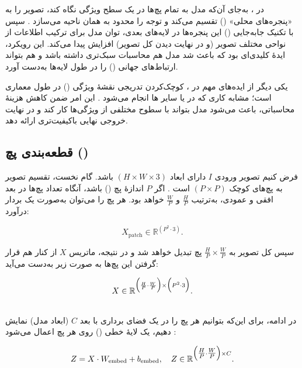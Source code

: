 در ، به‌جای آن‌که مدل به تمام پچ‌ها در یک سطح ویژگی نگاه کند، تصویر را به «پنجره‌های محلی» () تقسیم می‌کند و توجه را محدود به همان ناحیه می‌سازد \cite{liu2021swintransformer}. سپس با تکنیک جابه‌جایی () این پنجره‌ها در لایه‌های بعدی، توان مدل برای ترکیب اطلاعات از نواحی مختلف تصویر (و در نهایت دیدن کل تصویر) افزایش پیدا می‌کند. این رویکرد، ایدهٔ کلیدی‌ای بود که باعث شد مدل هم محاسبات سبک‌تری داشته باشد و هم بتواند ارتباط‌های جهانی () را در طول لایه‌ها به‌دست آورد.

یکی دیگر از ایده‌های مهم در ، کوچک‌کردن تدریجی نقشهٔ ویژگی () در طول معماری است؛ مشابه کاری که در  یا سایر ها انجام می‌شود \cite{he2016deep}. این امر ضمن کاهش هزینهٔ محاسباتی، باعث می‌شود مدل بتواند با سطوح مختلفی از ویژگی‌ها کار کند و در نهایت خروجی نهایی باکیفیت‌تری ارائه دهد.

\subsection{قطعه‌بندی پچ ()}
فرض کنیم تصویر ورودی \(\displaystyle I\) دارای ابعاد \(\displaystyle (H \times W \times 3)\) باشد. گام نخست، تقسیم تصویر به پچ‌های کوچک \(\displaystyle (P \times P)\) است \cite{dosovitskiy2020image}. اگر \(P\) اندازهٔ پچ () باشد، آنگاه تعداد پچ‌ها در بعد افقی و عمودی، به‌ترتیب \(\displaystyle \frac{H}{P}\) و \(\displaystyle \frac{W}{P}\) خواهد بود. هر پچ را می‌توان به‌صورت یک بردار درآورد:

\[
X_{\text{patch}} \in \mathbb{R}^{(P^2 \cdot 3)}.
\]

سپس کل تصویر به \(\displaystyle \frac{H}{P} \times \frac{W}{P}\) پچ تبدیل خواهد شد و در نتیجه، ماتریس \(\displaystyle X\) از کنار هم قرار گرفتن این پچ‌ها به صورت زیر به‌دست می‌آید:

\[
X \in \mathbb{R}^{\Bigl(\frac{H}{P} \cdot \frac{W}{P}\Bigr) \times \Bigl(P^2 \cdot 3\Bigr)}.
\]

\subsection{}
در ادامه، برای این‌که بتوانیم هر پچ را در یک فضای برداری با بعد \(\displaystyle C\) (ابعاد مدل) نمایش دهیم، یک لایهٔ خطی () روی هر پچ اعمال می‌شود \cite{dosovitskiy2020image,liu2021swintransformer}:

\[
Z = X \cdot W_{\text{embed}} + b_{\text{embed}}, 
\quad
Z \in \mathbb{R}^{\Bigl(\tfrac{H}{P} \cdot \tfrac{W}{P}\Bigr) \times C}.
\]

